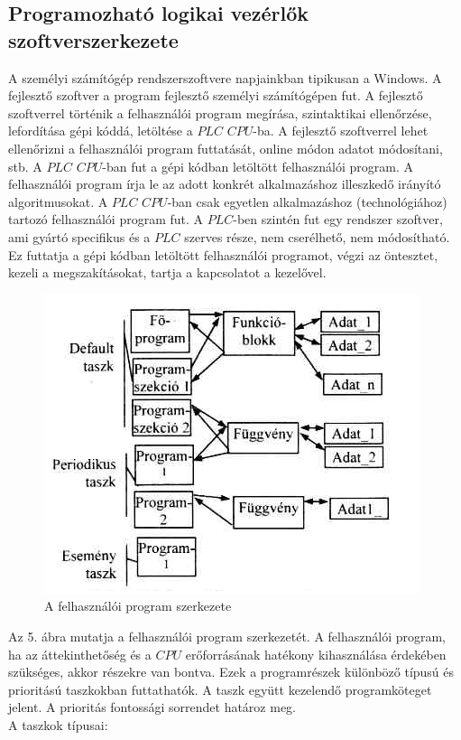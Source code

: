 \documentclass[11pt,a4paper]{article}
\begin{document}
\subsection{Programozható logikai vezérlők szoftverszerkezete}
A személyi számítógép rendszerszoftvere napjainkban tipikusan a Windows. A fejlesztő szoftver a program fejlesztő személyi számítógépen fut. A fejlesztő szoftverrel történik a felhasználói program megírása, szintaktikai ellenőrzése, lefordítása gépi kóddá, letöltése a $PLC$ $CPU$-ba. A fejlesztő szoftverrel lehet ellenőrizni a felhasználói program futtatását, online módon adatot módosítani, stb. A $PLC$ $CPU$-ban fut a gépi kódban letöltött felhasználói program. A felhasználói program írja le az adott konkrét alkalmazáshoz illeszkedő irányító algoritmusokat. A $PLC$ $CPU$-ban csak egyetlen alkalmazáshoz (technológiához) tartozó felhasználói program fut. 
A $PLC$-ben szintén fut egy rendszer szoftver, ami gyártó specifikus és a $PLC$ szerves része, nem cserélhető, nem módosítható. Ez futtatja a gépi kódban letöltött felhasználói programot, végzi az öntesztet, kezeli a megszakításokat, tartja a kapcsolatot a kezelővel.
\begin{figure}[hbtp]
    	 \centering
		\includegraphics[scale=0.7]{5_plc_program_szerk.png}
		\caption{A felhasználói program szerkezete}
\end{figure}
Az 5. ábra mutatja a  felhasználói program szerkezetét. A felhasználói program, ha  az áttekinthetőség és a $CPU$ erőforrásának hatékony kihasználása érdekében szükséges, akkor részekre van bontva. Ezek a programrészek különböző típusú és prioritású taszkokban futtathatók.
A taszk együtt kezelendő programköteget jelent. A prioritás fontossági sorrendet határoz meg.
\\A taszkok típusai:
\end{document}
